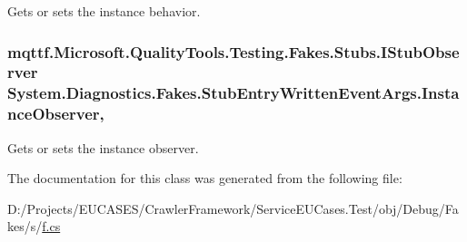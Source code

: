 Gets or sets the instance behavior.

\hypertarget{class_system_1_1_diagnostics_1_1_fakes_1_1_stub_entry_written_event_args_a67ca002348e58eda7550b0063185d7be}{
\subsubsection[{Instance\-Observer}]{\setlength{\rightskip}{0pt plus 5cm}mqttf.\-Microsoft.\-Quality\-Tools.\-Testing.\-Fakes.\-Stubs.\-I\-Stub\-Observer System.\-Diagnostics.\-Fakes.\-Stub\-Entry\-Written\-Event\-Args.\-Instance\-Observer\hspace{0.3cm}{\ttfamily [get]}, {\ttfamily [set]}}}\label{class_system_1_1_diagnostics_1_1_fakes_1_1_stub_entry_written_event_args_a67ca002348e58eda7550b0063185d7be}


Gets or sets the instance observer.



The documentation for this class was generated from the following file\-:\begin{DoxyCompactItemize}
\item 
D\-:/\-Projects/\-E\-U\-C\-A\-S\-E\-S/\-Crawler\-Framework/\-Service\-E\-U\-Cases.\-Test/obj/\-Debug/\-Fakes/s/\hyperlink{s_2f_8cs}{f.\-cs}\end{DoxyCompactItemize}
